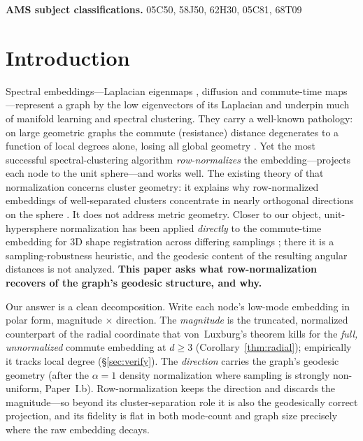 \documentclass[11pt]{article}
\theoremstyle{remark}
\begin{document}
\noindent\textbf{AMS subject classifications.} 05C50, 58J50, 62H30, 05C81, 68T09

\section{Introduction}
Spectral embeddings---Laplacian eigenmaps \cite{belkin2003}, diffusion and
commute-time maps \cite{coifman2006}---represent a graph by the low eigenvectors
of its Laplacian and underpin much of manifold learning and spectral clustering.
They carry a well-known pathology: on large geometric graphs the commute
(resistance) distance degenerates to a function of local degrees alone, losing
all global geometry \cite{vonluxburg2014}. Yet the most successful
spectral-clustering algorithm \cite{ng2002} \emph{row-normalizes} the
embedding---projects each node to the unit sphere---and works well. The
existing theory of that normalization concerns cluster geometry: it explains
why row-normalized embeddings of well-separated clusters concentrate in nearly
orthogonal directions on the sphere \cite{schiebinger2015,vonluxburg2008}. It
does not address metric geometry. Closer to our object, unit-hypersphere
normalization has been applied \emph{directly} to the commute-time embedding for
$3$D shape registration across differing samplings \cite{sharma2012}; there it is
a sampling-robustness heuristic, and the geodesic content of the resulting
angular distances is not analyzed. \textbf{This paper asks what row-normalization
recovers of the graph's geodesic structure, and why.}

Our answer is a clean decomposition. Write each node's low-mode embedding in polar
form, magnitude $\times$ direction. The \emph{magnitude} is the truncated,
normalized counterpart of the radial coordinate that von~Luxburg's theorem kills
for the \emph{full, unnormalized} commute embedding at $d\ge3$
(Corollary~\ref{thm:radial}); empirically it tracks local degree
(\S\ref{sec:verify}). The \emph{direction} carries
the graph's geodesic geometry (after the $\alpha{=}1$ density normalization
where sampling is strongly non-uniform, Paper~I.b). Row-normalization
keeps the direction and discards
the magnitude---so beyond its cluster-separation role it is also the
geodesically correct projection, and its fidelity is flat in both mode-count and
graph size precisely where the raw embedding decays.
\end{document}

